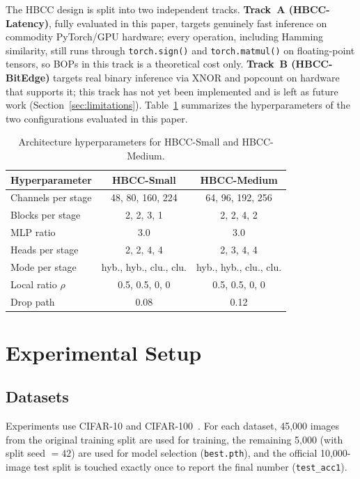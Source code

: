 \documentclass[journal]{IEEEtran}
\begin{document}
The HBCC design is split into two independent tracks. \textbf{Track~A (HBCC-Latency)}, fully evaluated in this paper, targets genuinely fast inference on commodity PyTorch/GPU hardware; every operation, including Hamming similarity, still runs through \texttt{torch.sign()} and \texttt{torch.matmul()} on floating-point tensors, so BOPs in this track is a theoretical cost only. \textbf{Track~B (HBCC-BitEdge)} targets real binary inference via XNOR and popcount on hardware that supports it; this track has not yet been implemented and is left as future work (Section~\ref{sec:limitations}). Table~\ref{tab:configs} summarizes the hyperparameters of the two configurations evaluated in this paper.

\begin{table}[H]
\centering
\caption{Architecture hyperparameters for HBCC-Small and HBCC-Medium.}
\label{tab:configs}
\begin{tabular}{lcc}
\toprule
\textbf{Hyperparameter} & \textbf{HBCC-Small} & \textbf{HBCC-Medium} \\
\midrule
Channels per stage & 48, 80, 160, 224 & 64, 96, 192, 256 \\
Blocks per stage & 2, 2, 3, 1 & 2, 2, 4, 2 \\
MLP ratio & 3.0 & 3.0 \\
Heads per stage & 2, 2, 4, 4 & 2, 3, 4, 4 \\
Mode per stage & hyb., hyb., clu., clu. & hyb., hyb., clu., clu. \\
Local ratio $\rho$ & 0.5, 0.5, 0, 0 & 0.5, 0.5, 0, 0 \\
Drop path & 0.08 & 0.12 \\
\bottomrule
\end{tabular}
\end{table}

\section{Experimental Setup}
\label{sec:setup}

\subsection{Datasets}

Experiments use CIFAR-10 and CIFAR-100~\cite{Krizhevsky2009Cifar}. For each dataset, 45,000 images from the original training split are used for training, the remaining 5,000 (with split seed $=42$) are used for model selection (\texttt{best.pth}), and the official 10,000-image test split is touched exactly once to report the final number (\texttt{test\_acc1}).
\end{document}
